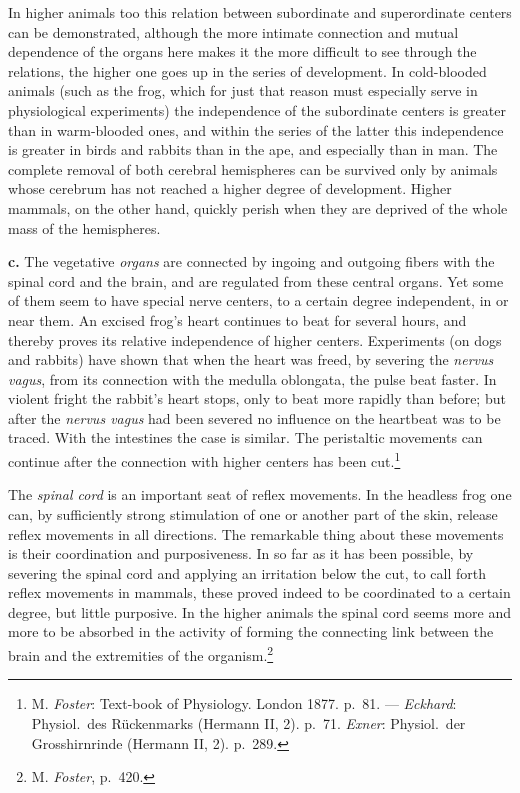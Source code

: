 \documentclass[12pt,a4paper]{book}
\newcommand{\opage}[1]{\marginnote{\footnotesize\textit{[#1]}}}
\begin{document}
In higher animals too this relation between subordinate and
superordinate centers can be demonstrated, although the more intimate
connection and mutual dependence of the organs here makes it the more
difficult to see through the relations, the higher one goes up in the
series of development. In cold-blooded animals (such as the frog, which
for just that reason must especially serve in physiological experiments)
the independence of the subordinate centers is greater than in
warm-blooded ones, and within the series of the latter this independence
is greater in birds and rabbits than in the ape, and especially than in
man. The complete removal of both cerebral hemispheres can be survived
only by animals whose cerebrum has not reached a higher degree of
development. Higher mammals, on the other hand,
\opage{47}quickly perish when they are deprived of the whole mass of the
hemispheres.

\textbf{c.} The vegetative \emph{organs} are connected by ingoing and
outgoing fibers with the spinal cord and the brain, and are regulated
from these central organs. Yet some of them seem to have special nerve
centers, to a certain degree independent, in or near them. An excised
frog's heart continues to beat for several hours, and thereby proves its
relative independence of higher centers. Experiments (on dogs and
rabbits) have shown that when the heart was freed, by severing the
\textit{nervus vagus}, from its connection with the medulla oblongata,
the pulse beat faster. In violent fright the rabbit's heart stops, only
to beat more rapidly than before; but after the \textit{nervus vagus}
had been severed no influence on the heartbeat was to be traced. With
the intestines the case is similar. The peristaltic movements can
continue after the connection with higher
centers has been cut.\footnote{M. \emph{Foster}: Text-book of
Physiology. London 1877. p.~81. --- \emph{Eckhard}: Physiol.\ des
Rückenmarks (Hermann II, 2). p.~71. \emph{Exner}: Physiol.\ der
Grosshirnrinde (Hermann II, 2). p.~289.}

The \emph{spinal cord} is an important seat of reflex movements. In the
headless frog one can, by sufficiently strong stimulation of one or
another part of the skin, release reflex movements in all directions.
The remarkable thing about these movements is their coordination and
purposiveness. In so far as it has been possible, by severing the spinal
cord and applying an irritation below the cut, to call forth reflex
movements in mammals, these proved indeed to be coordinated to a certain
degree, but little purposive. In the higher animals the spinal cord
seems more and more to be absorbed in the activity of forming the
connecting link between the brain and the
extremities of the organism.\footnote{M. \emph{Foster}, p.~420.}
\end{document}
